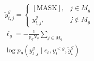 \documentclass[border=7pt,varwidth=108mm]{standalone}
\begin{document}
\color{ink}\fontsize{15}{23}\selectfont
\[
\begin{gathered} \widetilde y^g_{t,j}=\begin{cases}[\mathrm{MASK}],&j\in M_g\\y^g_{t,j},&j\notin M_g\end{cases}\\ \ell_g=-\frac{1}{p_gN_g}\sum_{j\in M_g}\\ \log p_\theta\!\left(y^g_{t,j}\mid c_t,y_t^{<g},\widetilde y_t^g\right)\end{gathered}
\]
\end{document}
